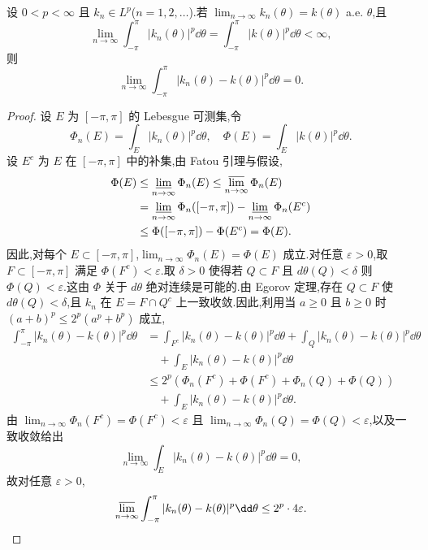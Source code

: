 \begin{lemma}\label{lem:2.7.2}
设 $0 < p < \infty$ 且 $k_{n} \in L^{p}$($n = 1, 2, \ldots$).若 $\lim_{n \to \infty}k_{n}(\theta) = k(\theta)$ a.e. $\theta$,且
\begin{equation*}
\lim_{n \to \infty}\int_{-\pi}^{\pi}|k_{n}(\theta)|^{p}\dd\theta = \int_{-\pi}^{\pi}|k(\theta)|^{p}\dd\theta < \infty,
\end{equation*}
则
\begin{equation*}
\lim_{n \to \infty}\int_{-\pi}^{\pi}|k_{n}(\theta) - k(\theta)|^{p}\dd\theta = 0.
\end{equation*}
\end{lemma}

\begin{proof}
设 $E$ 为 $[-\pi, \pi]$ 的 Lebesgue 可测集,令
\begin{equation*}
\Phi_{n}(E) = \int_{E}|k_{n}(\theta)|^{p}\dd\theta, \quad \Phi(E) = \int_{E}|k(\theta)|^{p}\dd\theta.
\end{equation*}
设 $E^{c}$ 为 $E$ 在 $[-\pi, \pi]$ 中的补集,由 Fatou 引理与假设,
\begin{align*}
\Phi(E) & \leq \varliminf_{n \to \infty}\Phi_{n}(E) \leq \varlimsup_{n \to \infty}\Phi_{n}(E) \\
& = \varliminf_{n \to \infty}\Phi_{n}([-\pi, \pi]) - \varliminf_{n \to \infty}\Phi_{n}(E^{c}) \\
& \leq \Phi([-\pi, \pi]) - \Phi(E^{c}) = \Phi(E).
\end{align*}
因此,对每个 $E \subset [-\pi, \pi]$,$\lim_{n \to \infty}\Phi_{n}(E) = \Phi(E)$ 成立.对任意 $\varepsilon > 0$,取 $F \subset [-\pi, \pi]$ 满足 $\Phi(F^{c}) < \varepsilon$.取 $\delta > 0$ 使得若 $Q \subset F$ 且 $d\theta(Q) < \delta$ 则 $\Phi(Q) < \varepsilon$.这由 $\Phi$ 关于 $d\theta$ 绝对连续是可能的.由 Egorov 定理,存在 $Q \subset F$ 使 $d\theta(Q) < \delta$,且 $k_{n}$ 在 $E = F \cap Q^{c}$ 上一致收敛.因此,利用当 $a \geq 0$ 且 $b \geq 0$ 时 $(a + b)^{p} \leq 2^{p}(a^{p} + b^{p})$ 成立,
\begin{align*}
\int_{-\pi}^{\pi}|k_{n}(\theta) - k(\theta)|^{p}\dd\theta&= \int_{F^{c}}|k_{n}(\theta) - k(\theta)|^{p}\dd\theta + \int_{Q}|k_{n}(\theta) - k(\theta)|^{p}\dd\theta  \\
&\quad + \int_{E}|k_{n}(\theta) - k(\theta)|^{p}\dd\theta \\
&\leq 2^{p}\left(\Phi_{n}(F^{c}) + \Phi(F^{c}) + \Phi_{n}(Q) + \Phi(Q)\right) \\
&\quad + \int_{E}|k_{n}(\theta) - k(\theta)|^{p}\dd\theta.
\end{align*}
由 $\lim_{n \to \infty}\Phi_{n}(F^{c}) = \Phi(F^{c}) < \varepsilon$ 且 $\lim_{n \to \infty}\Phi_{n}(Q) = \Phi(Q) < \varepsilon$,以及一致收敛给出
\begin{equation*}
\lim_{n \to \infty}\int_{E}|k_{n}(\theta) - k(\theta)|^{p}\dd\theta = 0,
\end{equation*}
故对任意 $\varepsilon > 0$,
\begin{equation*}
\varlimsup_{n \to \infty}\int_{-\pi}^{\pi}|k_{n}(\theta) - k(\theta)|^{p}\dd\theta \leq 2^{p}\cdot 4\varepsilon.
\end{equation*}
\end{proof}

